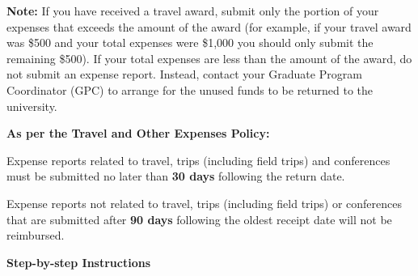      \noindent \textbf{\color{ocre}Note:} If you have received a travel award, submit only the portion of your expenses that exceeds the amount of the award (for example, if your travel award was \$500 and your total expenses were \$1,000 you should only submit the remaining \$500). If your total expenses are less than the amount of the award, do not submit an expense report. Instead, contact your Graduate Program Coordinator (GPC) to arrange for the unused funds to be returned to the university.\\
     
    
    \begin{plainexercise}
    \textbf{\sffamily \normalsize As per the Travel and Other Expenses Policy:} 
           
    Expense reports related to travel, trips (including field trips) and conferences must be submitted no later than \textbf{30 days} following the return date. 
    
    Expense reports not related to travel, trips (including field trips) or conferences that are submitted after \textbf{90 days} following the oldest receipt date will not be reimbursed.
    \end{plainexercise}


 

    
     \noindent \textbf{\sffamily Step-by-step Instructions}

